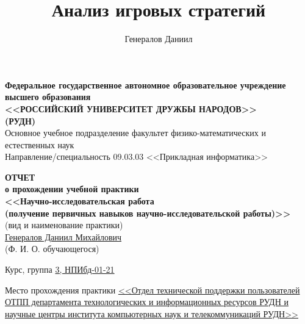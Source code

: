 \documentclass{article}
\title{Анализ игровых стратегий}
\author{Генералов Даниил}
\newcommand{\emptydate}{<<\underline{\phantom{99}}>> \underline{\phantom{февралиюня}} \the\year{} г.}
\begin{document}
\begin{titlepage}
    \setlength{\parindent}{0cm}
    
    \begin{center}
    \hfill \break 
    \textbf{
    \normalsize{Федеральное государственное автономное образовательное учреждение высшего образования}\\
    \large{<<РОССИЙСКИЙ УНИВЕРСИТЕТ ДРУЖБЫ НАРОДОВ>>\\
    (РУДН)}
    }\\
    \normalsize{Основное учебное подразделение факультет физико-математических и естественных наук}\\ 
    \normalsize{Направление/специальность 09.03.03 <<Прикладная информатика>>}\\
    
    \vspace*{\fill}
    
    
    
    
    
    
    
    \Large{\textbf{ОТЧЕТ\\ о прохождении учебной практики\\ <<Научно-исследовательская работа\\ (получение первичных навыков научно-исследовательской работы)>>}}
    \\
    \tiny{(вид и наименование практики)}
    \\ \vspace{5mm}
    \normalsize{\underline{Генералов Даниил Михайлович}}
    \\
    \tiny{(Ф. И. О. обучающегося)}
    \vspace*{\fill}
    \end{center}
    
    Курс, группа \underline{3, НПИбд-01-21}

    Место прохождения практики \underline{
        <<Отдел технической поддержки пользователей ОТПП департамента технологических и информационных ресурсов РУДН и научные центры института компьютерных наук и телекоммуникаций РУДН>>
    }


\end{titlepage}
\end{document}

